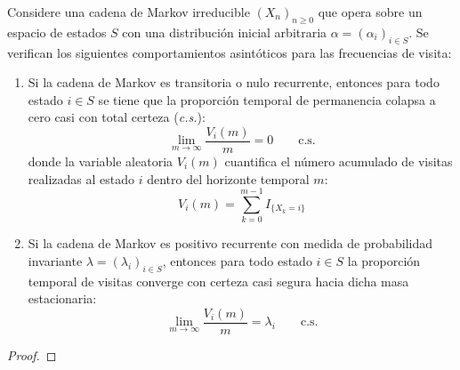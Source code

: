 \begin{teo}
    Considere una cadena de Markov irreducible $(X_n)_{n \geq 0}$ que opera sobre un espacio de estados $S$ con una distribución inicial arbitraria \mbox{$\alpha = (\alpha_i)_{i \in S}$}. Se verifican los siguientes comportamientos asintóticos para las frecuencias de visita:
    \begin{enumerate}
        \item Si la cadena de Markov es transitoria o nulo recurrente, entonces para todo estado $i \in S$ se tiene que la proporción temporal de permanencia colapsa a cero casi con total certeza (\textit{c.s.}):
        \[
        \lim_{m \to \infty} \frac{V_i(m)}{m} = 0 \qquad \text{c.s.}
        \]
        donde la variable aleatoria $V_i(m)$ cuantifica el número acumulado de visitas realizadas al estado $i$ dentro del horizonte temporal $m$:
        \[ 
        V_i(m) = \sum_{k=0 }^{m-1} I_{\{X_k = i\}} 
        \]
        
        \item Si la cadena de Markov es positivo recurrente con medida de probabilidad invariante \mbox{$\lambda = (\lambda_i)_{i \in S}$}, entonces para todo estado $i \in S$ la proporción temporal de visitas converge con certeza casi segura hacia dicha masa estacionaria:
        \[
        \lim_{m \to \infty} \frac{V_i(m)}{m} = \lambda_i \qquad \text{c.s.}
        \]
    \end{enumerate}
\begin{proof}
\end{proof}
\end{teo}



